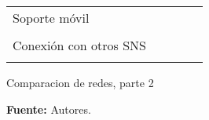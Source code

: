 \begin{landscape}
\begin{table}
\begin{center}
{\begin{tabular}{|p{5cm}|llll|}
    \hline
    Soporte móvil & \multicolumn{1}{c}{} & \multicolumn{1}{c}{} & \multicolumn{1}{c}{} & \multicolumn{1}{c|}{} \\ 
     & \multicolumn{1}{c}{} & \multicolumn{1}{c}{} & \multicolumn{1}{c}{} & \multicolumn{1}{c|}{} \\ 
    \hline
    Conexión con otros SNS & \multicolumn{1}{c}{} & \multicolumn{1}{c}{} & \multicolumn{1}{c}{} & \multicolumn{1}{c|}{} \\ 
     & \multicolumn{1}{c}{} & \multicolumn{1}{c}{} & \multicolumn{1}{c}{} & \multicolumn{1}{c|}{} \\ 
    \hline
  \end{tabular}
  }
    \end{center}
\end{table}
  
  \newpage
  
  \begin{table}
  \caption{Comparacion de redes, parte 2}
  \label{tab:comparacion_redes_2}

  \begin{center}
  
  \textbf{Fuente:} Autores.
  

\end{center}
\end{table}
\end{landscape}
